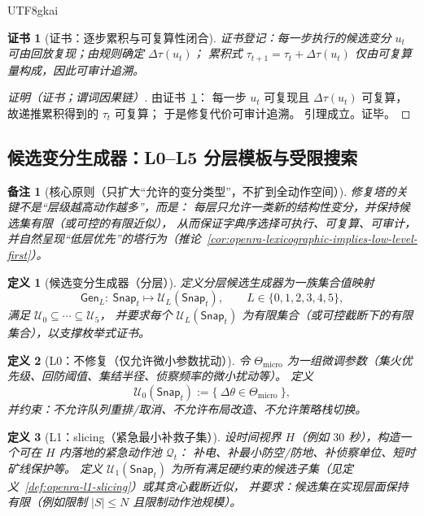 \documentclass[12pt]{article}
\newtheorem{definition}{定义}[section]
\newtheorem{remark}{备注}[section]
\newtheorem{Certificate}{证书}[section]
\begin{document}
\begin{CJK*}{UTF8}{gkai}
\begin{Certificate}[证书：逐步累积与可复算性闭合]
\label{cert:openra-tau-auditable}
证书登记：每一步执行的候选变分 $u_t$ 可由回放复现；由规则确定 $\Delta\tau(u_t)$；
累积式 $\tau_{t+1}=\tau_t+\Delta\tau(u_t)$ 仅由可复算量构成，因此可审计追溯。
\end{Certificate}

\begin{proof}[证明（证书；谓词因果链）]
由证书~\ref{cert:openra-tau-auditable}：
每一步 $u_t$ 可复现且 $\Delta\tau(u_t)$ 可复算，故递推累积得到的 $\tau_t$ 可复算；
于是修复代价可审计追溯。
引理成立。证毕。
\end{proof}

\subsection{候选变分生成器：L0--L5 分层模板与受限搜索}
\label{sec:openra-variation-generators}

\begin{remark}[核心原则（只扩大“允许的变分类型”，不扩到全动作空间）]
修复塔的关键不是“层级越高动作越多”，而是：
每层只允许一类新的结构性变分，并保持候选集有限（或可控的有限近似），
从而保证字典序选择可执行、可复算、可审计，并自然呈现“低层优先”的塔行为（推论~\ref{cor:openra-lexicographic-implies-low-level-first}）。
\end{remark}

\begin{definition}[候选变分生成器（分层）]
\label{def:openra-variation-generator}
定义分层候选生成器为一族集合值映射
\[
  \mathsf{Gen}_L:\ \mathsf{Snap}_t \longmapsto \mathcal{U}_L(\mathsf{Snap}_t),
  \qquad L\in\{0,1,2,3,4,5\},
\]
满足 $\mathcal{U}_0\subseteq\cdots\subseteq\mathcal{U}_5$，
并要求每个 $\mathcal{U}_L(\mathsf{Snap}_t)$ 为有限集合（或可控截断下的有限集合），以支撑枚举式证书。
\end{definition}

\begin{definition}[L0：不修复（仅允许微小参数扰动）]
\label{def:openra-gen-l0}
令 $\Theta_{\mathrm{micro}}$ 为一组微调参数（集火优先级、回防阈值、集结半径、侦察频率的微小扰动等）。
定义
\[
  \mathcal{U}_0(\mathsf{Snap}_t)
  :=
  \{\ \Delta\theta\in\Theta_{\mathrm{micro}}\ \},
\]
并约束：不允许队列重排/取消、不允许布局改造、不允许策略栈切换。
\end{definition}

\begin{definition}[L1：slicing（紧急最小补救子集）]
\label{def:openra-gen-l1}
设时间视界 $H$（例如 $30$ 秒），构造一个可在 $H$ 内落地的紧急动作池 $\mathcal{Q}_t$：
补电、补最小防空/防地、补侦察单位、短时矿线保护等。
定义 $\mathcal{U}_1(\mathsf{Snap}_t)$ 为所有满足硬约束的候选子集（见定义~\ref{def:openra-l1-slicing}）或其贪心截断近似，
并要求：候选集在实现层面保持有限（例如限制 $|S|\le N$ 且限制动作池规模）。
\end{definition}


\end{CJK*}
\end{document}
